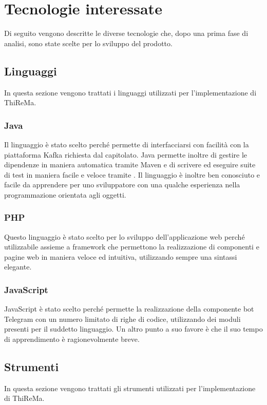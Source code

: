 \section{Tecnologie interessate}
	Di seguito vengono descritte le diverse tecnologie che, dopo una prima fase di analisi, sono state scelte per lo sviluppo del prodotto.
	\subsection{Linguaggi}
		In questa sezione vengono trattati i linguaggi utilizzati per l'implementazione di ThiReMa.
		\subsubsection{Java}
			Il linguaggio è stato scelto perché permette di interfacciarsi con facilità con la piattaforma Kafka richiesta dal capitolato. Java permette inoltre di gestire le dipendenze in maniera automatica tramite Maven e di scrivere ed eseguire suite di test in maniera facile e veloce tramite .
			\newline
			Il linguaggio è inoltre ben conosciuto e facile da apprendere per uno sviluppatore con una qualche esperienza nella programmazione orientata agli oggetti. 
		\subsubsection{PHP}
			Questo linguaggio è stato scelto per lo sviluppo dell'applicazione web perché utilizzabile assieme a framework che permettono la realizzazione di componenti e pagine web in maniera veloce ed intuitiva, utilizzando sempre una sintassi elegante.
		\subsubsection{JavaScript}
			JavaScript è stato scelto perché permette la realizzazione della componente bot Telegram con un numero limitato di righe di codice, utilizzando dei moduli presenti per il suddetto linguaggio.
			\newline
			Un altro punto a suo favore è che il suo tempo di apprendimento è ragionevolmente breve.
	\subsection{Strumenti}
		In questa sezione vengono trattati gli strumenti utilizzati per l'implementazione di ThiReMa.
